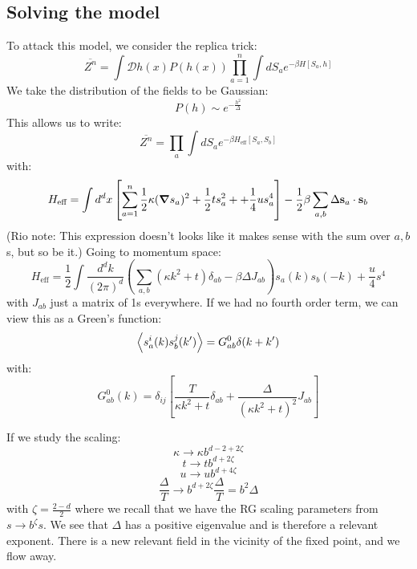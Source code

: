 \subsection{Solving the model}
To attack this model, we consider the replica trick:
\begin{equation}
    \overline{Z^n} = \int \mathcal{D}h(x) P(h(x)) \prod_{a=1}^n \int dS_a e^{-\beta H[S_a, h]}
\end{equation}
We take the distribution of the fields to be Gaussian:
\begin{equation}
    P(h) \sim e^{-\frac{h^2}{\Delta}}
\end{equation}
This allows us to write:
\begin{equation}
    \overline{Z^n} = \prod_a \int dS_a e^{-\beta H_{\text{eff}}[S_a, S_b]}
\end{equation}
with:
\begin{equation}
    H_{\text{eff}} = \int d^dx\left[\sum_{a=1}^n \frac{1}{2}\kappa (\nabla s_a)^2 + \frac{1}{2}ts_a^2 + + \frac{1}{4}us_a^4\right] - \frac{1}{2}\beta \sum_{a, b}\Delta \v{s}_a \cdot \v{s}_b
\end{equation}
(Rio note: This expression doesn't looks like it makes sense with the sum over $a, b$s, but so be it.) Going to momentum space:
\begin{equation}
    H_{\text{eff}} = \frac{1}{2}\int \frac{d^dk}{(2\pi)^d}\left(\sum_{a, b}(\kappa k^2 +t)\delta_{ab}  - \beta \Delta J_{ab}\right)s_a(k)s_b(-k) + \frac{u}{4}s^4
\end{equation}
with $J_{ab}$ just a matrix of 1s everywhere. If we had no fourth order term, we can view this as a Green's function:
\begin{equation}
    \left< s^i_a(k)s^j_b(k') \right> = G^0_{ab}\delta(k + k')
\end{equation}
with:
\begin{equation}
    G^0_{ab}(k) = \delta_{ij}\left[\frac{T}{\kappa k^2 + t}\delta_{ab} + \frac{\Delta}{(\kappa k^2 + t)^2}J_{ab}\right]
\end{equation}

If we study the scaling:
\begin{equation}
    \kappa \to \kappa b^{d-2+2\zeta}
\end{equation}
\begin{equation}
    t \to tb^{d+2\zeta}
\end{equation}
\begin{equation}
    u \to ub^{d+4\zeta}
\end{equation}
\begin{equation}
    \frac{\Delta}{T} \to b^{d+2\zeta}\frac{\Delta}{T} = b^2\Delta
\end{equation}
with $\zeta = \frac{2-d}{2}$ where we recall that we have the RG scaling parameters from $s \to b^\zeta s$. We see that $\Delta$ has a positive eigenvalue and is therefore a relevant exponent. There is a new relevant field in the vicinity of the fixed point, and we flow away.

